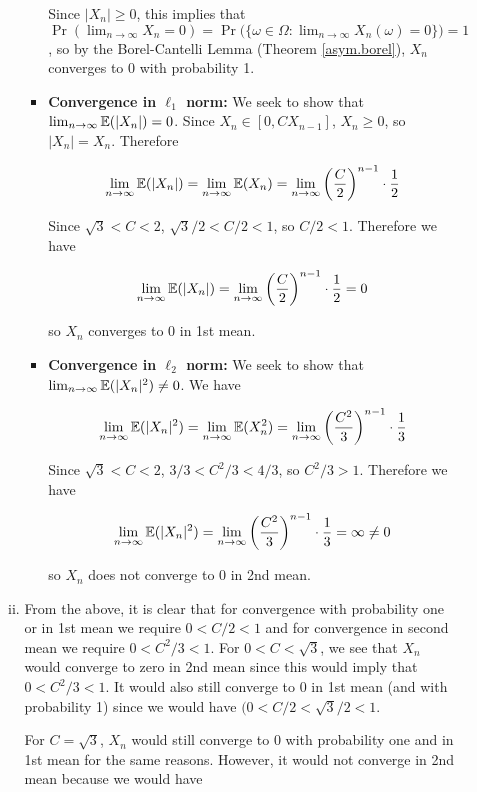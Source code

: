 \begin{enumerate}[(1)]
\begin{enumerate}[(a)]
\begin{enumerate}[(i)]
\begin{itemize}
Since \(|X_n| \geq 0\), this implies that \(\Pr(\lim_{n \to \infty} X_n = 0) = \Pr\big( \{\omega \in \Omega: \lim_{n \to \infty} X_n(\omega) = 0 \} \big) = 1\), so by the Borel-Cantelli Lemma (Theorem \ref{asym.borel}), \(X_n\) converges to 0 with probability 1.

\item \textbf{Convergence in \(\ell_1\) norm:} We seek to show that \(\lim_{n \to \infty} \mathbb{E}(|X_n|) = 0\). Since \(X_n \in [0, C X_{n-1}]\), \(X_n \geq 0\), so \(|X_n| = X_n\). Therefore

\[
\lim_{n \to \infty} \mathbb{E}(|X_n|) = \lim_{n \to \infty} \mathbb{E}(X_n) = \lim_{n \to \infty} \bigg( \frac{C}{2}\bigg)^{n-1} \cdot \frac{1}{2}
\]

Since \(\sqrt{3} < C < 2\), \(\sqrt{3}/2 < C/2 < 1\), so \(C/2 < 1\). Therefore we have 

\[
\lim_{n \to \infty} \mathbb{E}(|X_n|)= \lim_{n \to \infty} \bigg( \frac{C}{2}\bigg)^{n-1} \cdot \frac{1}{2} = 0
\]

so \(X_n\) converges to 0 in 1st mean.

\item \textbf{Convergence in \(\ell_2\) norm:} We seek to show that \(\lim_{n \to \infty} \mathbb{E}(|X_n|^2) \neq 0\). We have

\[
\lim_{n \to \infty} \mathbb{E}(|X_n|^2) = \lim_{n \to \infty} \mathbb{E}(X_n^2) = \lim_{n \to \infty} \bigg( \frac{C^2}{3}\bigg)^{n-1} \cdot \frac{1}{3}
\]

Since \(\sqrt{3} < C < 2\), \(3/3 < C^2/3 < 4/3\), so \(C^2/3 > 1\). Therefore we have 

\[
\lim_{n \to \infty} \mathbb{E}(|X_n|^2) = \lim_{n \to \infty} \bigg( \frac{C^2}{3}\bigg)^{n-1} \cdot \frac{1}{3} = \infty \neq 0
\]

so \(X_n\) does not converge to 0 in 2nd mean.

\end{itemize} 

\item From the above, it is clear that for convergence with probability one or in 1st mean we require \(0 < C/2 < 1\) and for convergence in second mean we require \(0 < C^2/3 < 1\).  For \(0 < C < \sqrt{3}\), we see that \(X_n\) would converge to zero in 2nd mean since this would imply that  \(0 < C^2/3 < 1\). It would also still converge to 0 in 1st mean (and with probability 1) since we would have \((0 < C/2 < \sqrt{3}/2 < 1\). 

For \(C = \sqrt{3}\), \(X_n\) would still converge to 0 with probability one and in 1st mean for the same reasons. However, it would not converge in 2nd mean because we would have


\end{enumerate}
\end{enumerate}
\end{enumerate}
